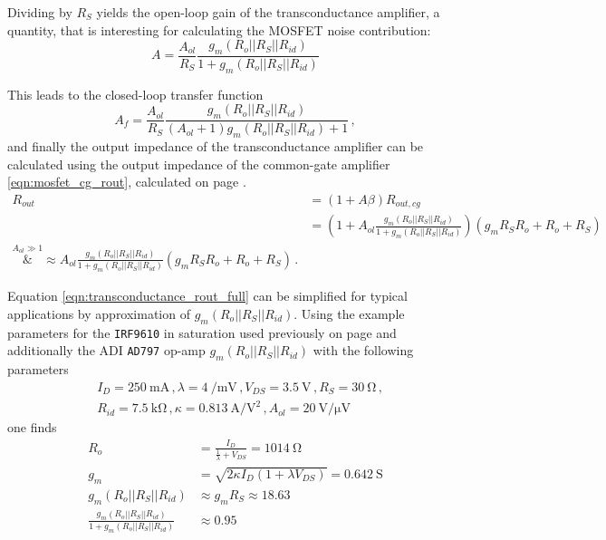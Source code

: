 \documentclass[12pt]{book}
\providecommand{\device}[1]{\texttt{\small #1}}
\begin{document}
Dividing by $R_S$ yields the open-loop gain of the transconductance amplifier, a quantity, that is interesting for calculating the MOSFET noise contribution:
\begin{equation}
    A = \frac{A_{ol}}{R_S} \frac{g_m \left(R_o || R_S || R_{id}\right)}{1 + g_m \left(R_o || R_S || R_{id}\right)} \label{eqn:transconductance_amplifier_open_loop_gain}
\end{equation}

This leads to the closed-loop transfer function
\begin{equation}
    A_f = \frac{A_{ol}}{R_S} \frac{g_m \left(R_o || R_S || R_{id}\right)}{(A_{ol}+1)g_m \left(R_o || R_S || R_{id}\right) + 1} \label{eqn:transconductance_amplifier_transfer_function} \,,
\end{equation}
and finally the output impedance of the transconductance amplifier can be calculated using the output impedance of the common-gate amplifier \ref{eqn:mosfet_cg_rout}, calculated on page \pageref{eqn:mosfet_cg_rout}.
\begin{align}
    R_{out} &= \left(1+ A\beta\right) R_{out,cg} \nonumber\\
    &= \left(1 + A_{ol} \frac{g_m \left(R_o || R_S || R_{id}\right)}{1 + g_m \left(R_o || R_S || R_{id}\right)} \right) \left(g_m R_S R_o + R_o + R_S \right) \nonumber\\
    \overset{A_{ol} \gg 1}&{\approx} A_{ol} \frac{g_m \left(R_o || R_S || R_{id}\right)}{1 + g_m \left(R_o || R_S || R_{id}\right)} \left(g_m R_S R_o + R_o + R_S \right) \,. \label{eqn:transconductance_rout_full}
\end{align}

Equation \ref{eqn:transconductance_rout_full} can be simplified for typical applications by approximation of $g_m \left(R_o || R_S || R_{id}\right)$. Using the example parameters for the \device{IRF9610} in saturation used previously on page \pageref{eqn:mosfet_rout_irf9610} and additionally the ADI \device{AD797} \cite{datasheet_AD797} op-amp $g_m \left(R_o || R_S || R_{id}\right)$ with the following parameters
\begin{align*}
    &I_D = \qty{250}{\mA} \,, \lambda = \qty[per-mode=power]{4}{\per \milli \volt} \,, V_{DS} = \qty{3.5}{\V}\,, R_S = \qty{30}{\ohm}\,,\\
    &R_{id} = \qty{7.5}{\kilo\ohm}\,, \kappa = \qty[per-mode=power]{0.813}{\ampere \per \square\volt}\,, A_{ol} = \qty[per-mode=power]{20}{\volt \per \uV}
\end{align*}
one finds
\begin{align*}
    R_{o} &= \frac{I_D}{\frac{1}{\lambda} + V_{DS}} = \qty{1014}{\ohm}\\
    g_m &= \sqrt{2 \kappa I_D \left(1+ \lambda V_{DS}\right)} = \qty{0.642}{\siemens}\\
    g_m \left(R_o || R_S || R_{id}\right) &\approx g_m R_S \approx \num{18.63}\\
    \frac{g_m \left(R_o || R_S || R_{id}\right)}{1 + g_m \left(R_o || R_S || R_{id}\right)} &\approx \num{0.95}
\end{align*}
\end{document}
